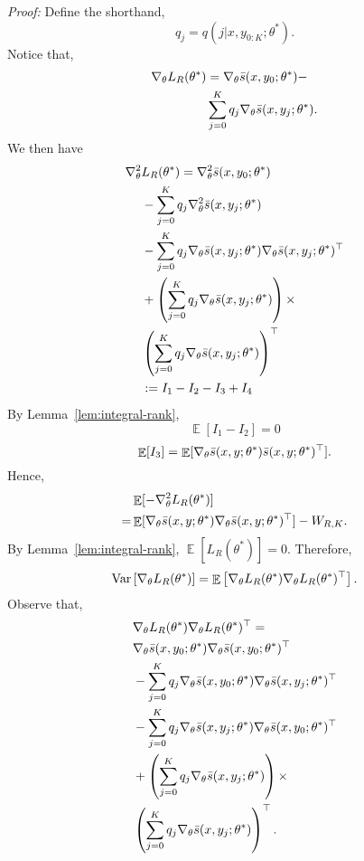 \documentclass[11pt,a4paper]{article}
\DeclareMathOperator{\E}{\mathbb{E}}
\newcommand{\var}{\operatorname{Var}}
\newcommand{\gtheta}{\ensuremath \nabla_{\theta}}
\newcommand{\ssf}[3]{\bar{s}(#1, #2; #3)}
\begin{document}
{\em Proof:}
Define the shorthand, 
\[
q_j =  q( j | x, y_{0:K}; \theta^*).
\]
Notice that, 
\begin{equation*}
\begin{aligned}
 \gtheta L_R(\theta^*) & = \gtheta  \ssf{x}{y_0}{\theta^*} - \\
 &  \sum_{j=0}^K q_j \gtheta \ssf{x}{y_j}{\theta^*}.
\label{eq:first-derivative-rank}
\end{aligned}
\end{equation*}
We then have   
\begin{equation}
\begin{aligned}
   \gtheta^2 & L_R (\theta^*)  = \gtheta^2 \ssf{x}{y_0}{\theta^*}  \\
  & - \sum_{j=0}^K q_j \gtheta^2 \ssf{x}{y_j}{\theta^*} \\
  & - \sum_{j=0}^K q_j \gtheta \ssf{x}{y_j}{\theta^*}\gtheta \ssf{x}{y_j}{\theta^*}^\top\\
  & + \left(\sum_{j=0}^K q_j \gtheta \ssf{x}{y_j}{\theta^*}\right) \times \\ 
  & \left(\sum_{j=0}^K q_j \gtheta \ssf{x}{y_j}{\theta^*}\right)^\top \\
  & := I_1 - I_2 - I_3 + I_4
\end{aligned}
\nonumber
\end{equation}
By Lemma~\ref{lem:integral-rank}, 
\[
\E[I_1 - I_2] = 0
\]
\[
\E[I_3] = \E[\gtheta  \ssf{x}{y}{\theta^*} \ssf{x}{y}{\theta^*}^\top].
\]
Hence,
\begin{equation*}
\begin{aligned}
    & \E[-\gtheta^2 L_R (\theta^*)]  \\
 =  & \E [\gtheta \ssf{x}{y}{\theta^*}\gtheta \ssf{x}{y}{\theta^*}^\top] - W_{R, K}. 
\end{aligned}
\end{equation*}
By Lemma~\ref{lem:integral-rank}, $\E [L_R(\theta^*)] = 0$. Therefore, 
\[
\var \left[\gtheta L_R(\theta^*) \right] = \E \left[\gtheta L_R(\theta^*) \gtheta L_R(\theta^*)^\top\right].
\]
Observe that, 
\begin{equation}
\begin{aligned}
  & \gtheta L_R(\theta^*) \gtheta L_R(\theta^*)^\top = \\ 
  & \gtheta \ssf{x}{y_0}{\theta^*}\gtheta \ssf{x}{y_0}{\theta^*}^\top \\
   & - \sum_{j=0}^K  q_j\gtheta \ssf{x}{y_0}{\theta^*}\gtheta \ssf{x}{y_j}{\theta^*}^\top \\
   & -  \sum_{j=0}^K  q_j\gtheta \ssf{x}{y_j}{\theta^*}\gtheta \ssf{x}{y_0}{\theta^*}^\top\\
   & +  \left(\sum_{j=0}^K q_j \gtheta \ssf{x}{y_j}{\theta^*}\right) \times \\
   & \left(\sum_{j=0}^K q_j \gtheta \ssf{x}{y_j}{\theta^*}\right)^\top. 
\end{aligned}
\nonumber
\end{equation}
\end{document}
